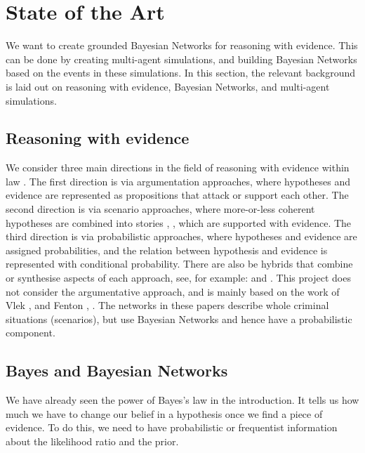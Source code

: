 
\chapter[State of the Art]{State of the Art}

We want to create grounded Bayesian Networks for reasoning with evidence. This can be done by creating multi-agent simulations, and building Bayesian Networks based on the events in these simulations. In this section, the relevant background is laid out on reasoning with evidence, Bayesian Networks, and multi-agent simulations.

\section{Reasoning with evidence}
We consider three main directions in the field of reasoning with evidence within law \citep{Verheij2015}. The first direction is via argumentation approaches, where hypotheses and evidence are represented as propositions that attack or support each other. The second direction is via scenario approaches, where more-or-less coherent hypotheses are combined into stories \citep{Pennington1993}, \citep{wagenaar1993}, which are supported with evidence. The third direction is via probabilistic approaches, where hypotheses and evidence are assigned probabilities, and the relation between hypothesis and evidence is represented with conditional probability. There are also be hybrids that combine or synthesise aspects of each approach, see, for example: \citep{Bex2010} and \citep{Timmer2016}. This project does not consider the argumentative approach, and is mainly based on the work of Vlek \citep{Vlek2015}, \citep{Vlek2016} and Fenton \citep{Fenton2012}, \citep{Fenton2019}. The networks in these papers describe whole criminal situations (scenarios), but use Bayesian Networks and hence have a probabilistic component.


\section{Bayes and Bayesian Networks}

We have already seen the power of Bayes's law in the introduction. It tells us how much we have to change our belief in a hypothesis once we find a piece of evidence. To do this, we need to have probabilistic or frequentist information about the likelihood ratio and the prior. 

